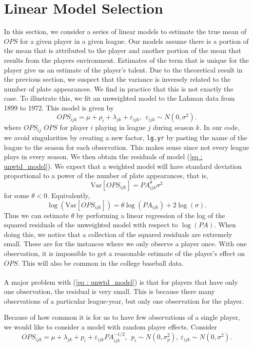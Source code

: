 \documentclass [52pt] {article}
\newcommand{\var}{\text{Var}}
\begin{document}
\section{Linear Model Selection}
In this section, we consider a series of linear models to estimate the true mean of $OPS$ for a given player in a given league.  Our models assume there is a portion of the mean that is attributed to the player and another portion of the mean that results from the players environment.  Estimates of the term that is unique for the player give us an estimate of the player's talent.  Due to the theoretical result in the previous section, we suspect that the variance is inversely related to the number of plate appearances.  We find in practice that this is not exactly the case.  To illustrate this, we fit an unweighted model to the Lahman data from 1899 to 1972.  This model is given by
\begin{equation}\label{eq : unwtd_model}
OPS_{ijk} = \mu+\rho_i+\lambda_{jk} +\varepsilon_{ijk}, \:\:\varepsilon_{ijk}\sim N(0, \sigma^2).
\end{equation}
where $OPS_{ij}$ $OPS$ for player $i$ playing in league $j$ during season $k$.  In our code, we avoid singularities by creating a new factor, \verb|lg.yr| by pasting the name of the league to the season for each observation.  This makes sense since not every league plays in every season.  We then obtain the residuals of model (\ref{eq : unwtd_model}).  We expect that a weighted model will have standard deviation proportional to a power of the number of plate appearances, that is, 
\[\var[OPS_{ijk}] = PA_{ijk}^{\theta}\sigma^2\]
for some $\theta <0$.  Equivalently, 
\[\log(\text{Var}[OPS_{ijk}]) = {\theta}\log(PA_{ijk}) + 2\log(\sigma).\]
Thus we can estimate $\theta$ by performing a linear regression of the log of the squared residuals of the unweighted model with respect to $\log(PA)$.  When doing this, we notice that a collection of the squared residuals are extremely small.  These are for the instances where we only observe a player once.  With one observation, it is impossible to get a reasonable estimate of the player's effect on $OPS$.  This will also be common in the college baseball data.
\\\\
A major problem with (\ref{eq : unwtd_model}) is that for players that have only one observation, the residual is very small.  This is because there many observations of a particular league-year, but only one observation for the player.

Because of how common it is for us to have few observations of a single player, we would like to consider a model with random player effects.  Consider
\begin{equation}\label{eq : rand_player_model}
OPS_{ijk} = \mu+\lambda_{jk} + p_i+\varepsilon_{ijk}PA_{ijk}^{-1/2}, \:\:p_i\sim N(0,\sigma^2_p),\:\varepsilon_{ijk}\sim N(0, \sigma^2).
\end{equation}
\end{document}
